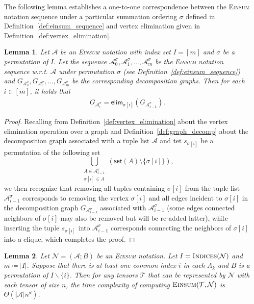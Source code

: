 \documentclass[sn-mathphys, natbib=false]{sn-jnl}
\theoremstyle{plain}
\newtheorem{lemma}{Lemma}
\theoremstyle{definition}
\def\Einsum{\textsc{Einsum}}
\newcommand{\takesetp}[1]{\mathsf{set}(#1)}
\newcommand{\indexset}{\textsc{Indices}}
\newcommand{\tensorcontraction}{\textsc{Einsum}}
\newcommand{\graphform}[1]{G_{#1}}
\newcommand{\appequal}{\Theta}
\newcommand{\eliminatevg}[2]{\mathsf{elim}_{#1}(#2)}
\def\calA{\mathcal{A}}
\def\calT{\mathcal{T}}
\def\calN{\mathcal{N}}
\begin{document}
\begin{bibunit}[agsm]
The following lemma establishes a one-to-one correspondence between the \Einsum{} notation sequence under a particular summation ordering $\sigma$ defined in Definition~\ref{def:einsum_sequence} and vertex elimination given in Definition~\ref{def:vertex_elimination}.

\begin{lemma}
\label{lem:einsum_graph_seq}
Let $\calA$ be an \Einsum{} notation with index set $I = [m]$ and $\sigma$ be a permutation of $I$. Let the sequence $\calA^{\sigma}_0, \calA^{\sigma}_1, \ldots, \calA^{\sigma}_m$ be the \Einsum{} notation sequence w.r.t. $\calA$ under permutation $\sigma$ (see Definition~\ref{def:einsum_sequence}) and $\graphform{\calA^{\sigma}_0}, \graphform{\calA^{\sigma}_1}, \ldots, \graphform{\calA^{\sigma}_m}$ be the corresponding decomposition graphs. Then for each $i \in [m]$, it holds that
\begin{align*}
   \graphform{\calA^{\sigma}_i} = \eliminatevg{\sigma[i]}{\graphform{\calA^{\sigma}_{i-1}}}.
\end{align*}
\end{lemma}

\begin{proof}
Recalling from Definition~\ref{def:vertex_elimination} about the vertex elimination operation over a graph and Definition~\ref{def:graph_decomp} about the decomposition graph associated with a tuple list $\calA$ and tet $s_{\sigma[i]}$ be a permutation of the following set 
\begin{equation*}
    \bigcup_{\substack{ A \in \calA^{\sigma}_{i-1} \\ \sigma[i] \in A}} (\takesetp{A} \setminus \{\sigma[i]\}), 
\end{equation*}
we then recognize that removing all tuples containing $\sigma[i]$ from the tuple list $\calA^{\sigma}_{i - 1}$ corresponds to removing the vertex $\sigma[i]$ and all edges incident to $\sigma[i]$ in the decomposition graph $\graphform{\calA^{\sigma}_{i-1}}$ associated with $\calA^{\sigma}_{i-1}$ (some edges connected neighbors of $\sigma[i]$ may also be removed but will be re-added latter), while inserting the tuple $s_{\sigma[i]}$ into $\calA^{\sigma}_{i-1}$ corresponds connecting the neighbors of $\sigma[i]$ into a clique, which completes the proof. 
\end{proof}

\begin{lemma}
\label{lem:complexity_one_index}
Let $\calN = (\calA; B)$ be an \Einsum{} notation. Let $I = \indexset(\calN)$ and $m \coloneqq |I|$. Suppose that there is at least one common index $i$ in each $A_k$ and $B$ is a permutation of $I \backslash \{i\}$. Then for any tensors $\calT$ that can be represented by $\calN$ with each tensor of size $n$, the time complexity of computing $\tensorcontraction(\calT, \calN)$ is $\appequal(|\calA|n^{d})$.
\end{lemma}


\end{bibunit}
\end{document}
